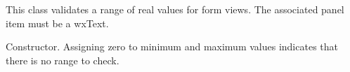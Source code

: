\section{}\label{wxrealformvalidator}

This class validates a range of real values for form views. The associated panel item must be a wxText.






Constructor. Assigning zero to minimum and maximum values indicates that there is no range to check.

